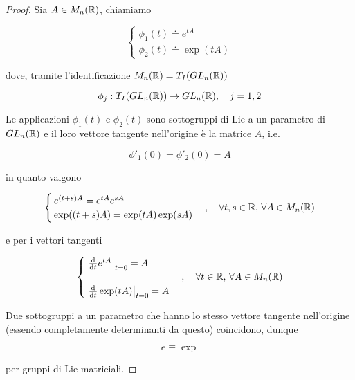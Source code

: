 \begin{proof}
	Sia $ A \in M_{n}(\mathbb{R}) $, chiamiamo
	
	\begin{equation}
		\begin{cases}
			\phi_{1}(t) \doteq e^{t A}\\
			\phi_{2}(t) \doteq \exp(t A)
		\end{cases}
	\end{equation}

	dove, tramite l'identificazione $ M_{n}(\mathbb{R}) = T_{I}(GL_{n}(\mathbb{R})) $
	
	\begin{equation}
		\phi_{j} : T_{I}(GL_{n}(\R)) \to GL_{n}(\R) \qcomma j=1,2
	\end{equation}

	Le applicazioni $ \phi_{1}(t) $ e $ \phi_{2}(t) $ sono sottogruppi di Lie a un parametro di $ GL_{n}(\mathbb{R}) $ e il loro vettore tangente nell'origine è la matrice $ A $, i.e.
	
	\begin{equation}
		\phi'_{1}(0) = \phi'_{2}(0) = A
	\end{equation}

	in quanto valgono
	
	\begin{equation}
		\begin{cases}
			e^{(t+s) A} = e^{t A} e^{s A}\\
			\exp((t+s) A) = \exp(t A) \exp(s A)
		\end{cases}%
		\qcomma \forall t,s \in \R, \, \forall A \in M_{n}(\R)
	\end{equation}

	e per i vettori tangenti
	
	\begin{equation}
		\begin{cases}
			\eval{ \dv{t} e^{t A} }_{t=0} = A\\\\
			\eval{ \dv{t} \exp(t A) }_{t=0} = A
		\end{cases}%
		\qcomma \forall t \in \R, \, \forall A \in M_{n}(\R)
	\end{equation}

	Due sottogruppi a un parametro che hanno lo stesso vettore tangente nell'origine (essendo completamente determinanti da questo) coincidono, dunque
	
	\begin{equation}
		e \equiv \exp
	\end{equation}

	per gruppi di Lie matriciali.
\end{proof}

